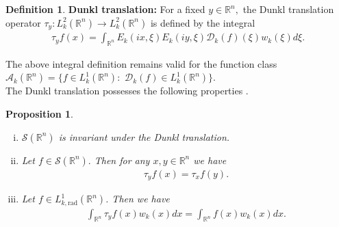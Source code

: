 \documentclass[11pt,a4paper,reqno]{amsproc}
\newtheorem{proposition}[theorem]{Proposition}
\theoremstyle{definition}
\newtheorem{definition}[theorem]{Definition}
\theoremstyle{remark}
\numberwithin{equation}{section}
\begin{document}
\begin{definition}\textbf{Dunkl translation:}\cite{Thangavelu}
    For a fixed $y\in \mathbb{R}^n,$ the Dunkl translation operator $\tau_y:L_k^2(\mathbb{R}^n) \longrightarrow L_k^2(\mathbb{R}^n)$ is defined by the integral
     \begin{align*}
        \tau_yf(x)= \int_{\mathbb{R}^n} E_k(
        ix,\xi)E_k(iy,\xi)\mathcal{D}_k(f)(\xi)w_k(\xi)d\xi.
     \end{align*}
    \end{definition}
The above integral definition remains valid for the function class $ \mathcal{A}_k(\mathbb{R}^n) = \{ f \in L_k^1(\mathbb{R}^n):\,\, \mathcal{D}_k(f) \in L^1_k(\mathbb{R}^n)\}$.\\

The Dunkl translation possesses the following properties \cite{Rosler-2003, trimeche-2002}.
\begin{proposition} \label{translation property}
    \begin{enumerate}[(i)]
     \item $\mathcal{S}(\mathbb{R}^n)$ is invariant under the Dunkl translation.
    \item Let $f\in \mathcal{S}(\mathbb{R}^n).$ Then for any $x,y\in \mathbb{R}^n$ we have  
    \begin{eqnarray*}
        \tau_yf(x)=\tau_xf(y). 
    \end{eqnarray*}
   \item Let $f \in L^1_{k,\text{rad}}(\mathbb{R}^n)$. Then we have 
    \begin{align*} 
        \int_{\mathbb{R}^n} \tau_yf(x)w_k(x)dx = \int_{\mathbb{R}^n} f(x) w_k(x)dx.
    \end{align*} 
\end{enumerate}
\end{proposition}
\end{document}
